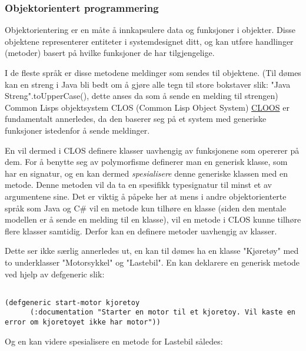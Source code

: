 \documentclass[11pt]{article}
\begin{document}
\subsubsection{Objektorientert programmering}



Objektorientering er en måte å innkapsulere data og funksjoner i objekter. Disse objektene representerer entiteter i systemdesignet ditt, og kan utføre handlinger (metoder) basert på hvilke funksjoner de har tilgjengelige. 



I de fleste språk er disse metodene meldinger som sendes til objektene. (Til dømes kan en streng i Java bli bedt om å gjøre alle tegn til store bokstaver slik: "Java Streng".toUpperCase(), dette anses da som å sende en melding til strengen) Common Lisps objektsystem CLOS (Common Lisp Object System) \href{(http://www.dreamsongs.com/NewFiles/ECOOP.pdf}{CLOOS} er fundamentalt annerledes, da den baserer seg på et system med generiske funksjoner istedenfor å sende meldinger.



En vil dermed i CLOS definere klasser uavhengig av funksjonene som opererer på dem. For å benytte seg av polymorfisme definerer man en generisk klasse, som har en signatur, og en kan dermed \emph{spesialisere} denne generiske klassen med en metode. Denne metoden vil da ta en spesifikk typesignatur til minst et av argumentene sine. Det er viktig å påpeke her at mens i andre objektorienterte språk som Java og C\# vil en metode kun tilhøre en klasse (siden den mentale modellen er å sende en melding til en klasse), vil en metode i CLOS kunne tilhøre flere klasser samtidig. Derfor kan en definere metoder uavhengig av klasser.



Dette ser ikke særlig annerledes ut, en kan til dømes ha en klasse "Kjøretøy" med to underklasser "Motorsykkel" og "Lastebil". En kan deklarere en generisk metode ved hjelp av defgeneric slik:




\begin{lstlisting}

(defgeneric start-motor kjoretoy
      (:documentation "Starter en motor til et kjoretoy. Vil kaste en error om kjoretoyet ikke har motor"))
\end{lstlisting}




Og en kan videre spesialisere en metode for Lastebil således:
\end{document}
